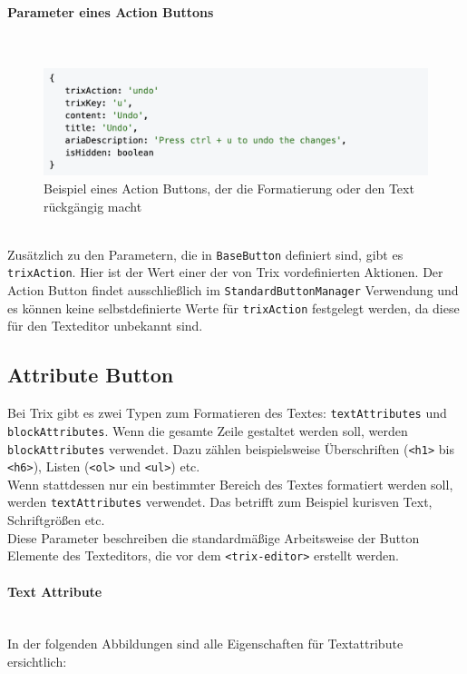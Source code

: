 \paragraph{Parameter eines Action Buttons}\mbox{}\\
\begin{figure}[H]
\begin{center}
	\includegraphics[scale=.7]{images/action-button.png}
\end{center}
	\caption{Beispiel eines Action Buttons, der die Formatierung oder den Text rückgängig macht}
\end{figure}

\mbox{}\\
Zusätzlich zu den Parametern, die in \texttt{BaseButton} definiert sind, gibt es \texttt{trixAction}. Hier ist der Wert einer der von Trix
vordefinierten Aktionen. Der Action Button findet ausschließlich im \texttt{StandardButtonManager} Verwendung und es können
keine selbstdefinierte Werte für \texttt{trixAction} festgelegt werden, da diese für den Texteditor unbekannt sind.

\newpage
\subsection{Attribute Button}
Bei Trix gibt es zwei Typen zum Formatieren des Textes: \texttt{textAttributes} und \\
\texttt{blockAttributes}. Wenn die gesamte Zeile gestaltet werden soll, werden \\
\texttt{blockAttributes} verwendet. Dazu zählen beispielsweise Überschriften (\texttt{<h1>} bis \texttt{<h6>}), Listen (\texttt{<ol>} 
und \texttt{<ul>}) etc.\\ Wenn stattdessen nur ein bestimmter Bereich des Textes formatiert werden soll, werden 
\texttt{textAttributes} verwendet. Das betrifft zum Beispiel kurisven Text, Schriftgrößen etc.\\
Diese Parameter beschreiben die standardmäßige Arbeitsweise der Button Elemente des Texteditors, die vor dem 
\texttt{<trix-editor>} erstellt werden.

\paragraph{Text Attribute}
\label{paragraph_textAttribute}\mbox{}\\
In der folgenden Abbildungen sind alle Eigenschaften für Textattribute ersichtlich:

